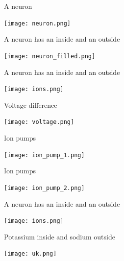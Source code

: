 \documentclass{beamer}
\begin{document}
\begin{frame}{A neuron}
  \begin{center}
    \texttt{[image: neuron.png]}
  \end{center}
\end{frame}

\begin{frame}{A neuron has an inside and an outside}
  \begin{center}
    \texttt{[image: neuron\_filled.png]}
  \end{center}
\end{frame}

\begin{frame}{A neuron has an inside and an outside}
  \begin{center}
    \texttt{[image: ions.png]}
  \end{center}
\end{frame}


\begin{frame}{Voltage difference}
\begin{center}
    \texttt{[image: voltage.png]}
\end{center}
\end{frame}

\begin{frame}{Ion pumps}
  \begin{center}
    \texttt{[image: ion\_pump\_1.png]}
  \end{center}
\end{frame}


\begin{frame}{Ion pumps}
  \begin{center}
    \texttt{[image: ion\_pump\_2.png]}
  \end{center}
\end{frame}


\begin{frame}{A neuron has an inside and an outside}
  \begin{center}
    \texttt{[image: ions.png]}
  \end{center}
\end{frame}


\begin{frame}{Potassium inside and sodium outside}
  \begin{center}
    \texttt{[image: uk.png]}
  \end{center}
\end{frame}
\end{document}
